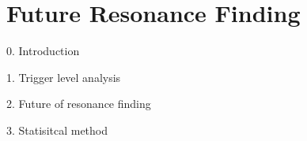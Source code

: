 
\chapter{Future Resonance Finding}
\label{chapter:weird}

0. Introduction

1. Trigger level analysis

2. Future of resonance finding

3. Statisitcal method  


